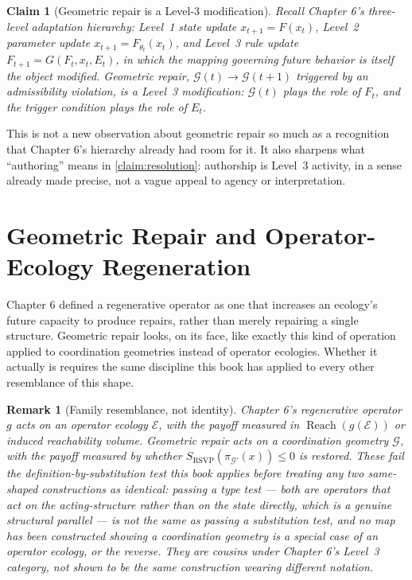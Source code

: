 \documentclass[12pt]{report}
\newtheorem{claim}[definition]{Claim}
\newtheorem{remark}[definition]{Remark}
\newcommand{\Reach}{\ensuremath{\operatorname{Reach}}}
\begin{document}
\begin{claim}[Geometric repair is a Level-3 modification]
\label{claim:geometric-is-level3}
Recall Chapter 6's three-level adaptation hierarchy: Level~1 state update
$x_{t+1} = F(x_t)$, Level~2 parameter update $x_{t+1} = F_{\theta_t}(x_t)$,
and Level~3 rule update $F_{t+1} = G(F_t, x_t, E_t)$, in which the
mapping governing future behavior is itself the object modified.
Geometric repair, $\mathcal{G}(t) \to \mathcal{G}(t+1)$ triggered by an
admissibility violation, is a Level~3 modification: $\mathcal{G}(t)$ plays
the role of $F_t$, and the trigger condition plays the role of $E_t$.
\end{claim}

This is not a new observation about geometric repair so much as a
recognition that Chapter 6's hierarchy already had room for it. It also
sharpens what ``authoring'' means in \cref{claim:resolution}: authorship
is Level~3 activity, in a sense already made precise, not a vague
appeal to agency or interpretation.

\section{Geometric Repair and Operator-Ecology Regeneration}
\label{sec:comparison}

Chapter 6 defined a regenerative operator as one that increases an
ecology's future capacity to produce repairs, rather than merely
repairing a single structure. Geometric repair looks, on its face, like
exactly this kind of operation applied to coordination geometries instead
of operator ecologies. Whether it actually is requires the same
discipline this book has applied to every other resemblance of this
shape.

\begin{remark}[Family resemblance, not identity]
\label{rem:geometric-vs-regenerative}
Chapter 6's regenerative operator $g$ acts on an operator ecology
$\mathcal{E}$, with the payoff measured in $\Reach(g(\mathcal{E}))$ or
induced reachability volume. Geometric repair acts on a coordination
geometry $\mathcal{G}$, with the payoff measured by whether
$S_{\mathrm{RSVP}}(\pi_{\mathcal{G}'}(x)) \leq 0$ is restored. These fail
the definition-by-substitution test this book applies before treating
any two same-shaped constructions as identical: passing a type test ---
both are operators that act on the acting-structure rather than on the
state directly, which is a genuine structural parallel --- is not the
same as passing a substitution test, and no map has been constructed
showing a coordination geometry is a special case of an operator
ecology, or the reverse. They are cousins under Chapter 6's Level~3
category, not shown to be the same construction wearing different
notation.
\end{remark}
\end{document}
